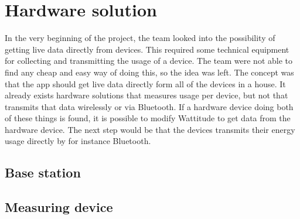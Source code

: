 \section{Hardware solution}

In the very beginning of the project, the team looked into the possibility of getting live data directly from devices. This required some technical equipment for collecting and transmitting the usage of a device. The team were not able to find any cheap and easy way of doing this, so the idea was left. The concept was that the app should get live data directly form all of the devices in a house. It already exists hardware solutions that measures usage per device, but not that transmits that data wirelessly or via Bluetooth. If a hardware device doing both of these things is found, it is possible to modify Wattitude to get data from the hardware device. The next step would be that the devices transmits their energy usage directly by for instance Bluetooth. 

\subsection{Base station}

\subsection{Measuring device}

